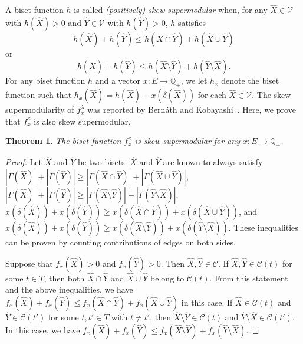 \documentclass{article}
\newtheorem{theorem}{Theorem}
\newcommand{\Cfam}{\mathcal{C}}
\newcommand{\Vfam}{\mathcal{V}}
\newcommand{\Rset}{\mathbb{Q}}
\newcommand{\f}{f^{\kappa}}
\newcommand{\g}{f^{\lambda}}
\begin{document}
A biset function $h$ is called \emph{{\rm (}positively{\rm )} skew supermodular} when, 
for any $\hat{X} \in \Vfam$ with $h(\hat{X})>0$ and $\hat{Y}\in \Vfam$ with $h(\hat{Y})>0$, 
$h$ satisfies 
\begin{equation}\label{eq:supermodular}
h(\hat{X})+h(\hat{Y}) \leq h(\hat{X}\cap \hat{Y}) + h(\hat{X} \cup \hat{Y})
\end{equation}
or
\begin{equation}\label{eq:negamodular}
h(\hat{X})+h(\hat{Y}) \leq h(\hat{X}\setminus \hat{Y}) + h(\hat{Y} \setminus \hat{X}).
\end{equation}
For any biset function $h$ and a vector
$x\colon E \rightarrow \Rset_+$,
we let $h_{x}$ denote the biset function such that
$h_{x}(\hat{X})=h(\hat{X})-x(\delta(\hat{X}))$ for each $\hat{X} \in \Vfam$.
The skew supermodularity of $\g_{x}$ was reported by Bern{\'a}th and
Kobayashi~\cite{Bernath2014}. Here, we prove that $\f_{x}$ is also skew supermodular.

\begin{theorem}\label{thm:skewsupermodular}
The biset function $\f_{x}$ is skew supermodular for any $x\colon E \rightarrow \Rset_+$.
\end{theorem}
\begin{proof}
Let $\hat{X}$ and $\hat{Y}$ be two bisets.
$\hat{X}$ and $\hat{Y}$ are known to always satisfy
$|\Gamma(\hat{X})|+|\Gamma(\hat{Y})| \geq |\Gamma(\hat{X}\cap \hat{Y})|+|\Gamma(\hat{X}\cup \hat{Y})|$,
$|\Gamma(\hat{X})|+|\Gamma(\hat{Y})| \geq |\Gamma(\hat{X}\setminus \hat{Y})|+|\Gamma(\hat{Y}\setminus
\hat{X})|$,
$x(\delta(\hat{X}))+x(\delta(\hat{Y})) \geq x(\delta(\hat{X}\cap \hat{Y}))+x(\delta(\hat{X}\cup
\hat{Y}))$,
and
$x(\delta(\hat{X}))+x(\delta(\hat{Y})) 
\geq x(\delta(\hat{X}\setminus \hat{Y})) + x(\delta(\hat{Y}\setminus \hat{X}))$.
These inequalities can be proven by counting contributions of edges on both sides.

Suppose that $f_{x}(\hat{X}) >0$ and $f_{x}(\hat{Y})>0$.
Then $\hat{X},\hat{Y} \in \Cfam$.
If $\hat{X}, \hat{Y} \in \Cfam(t)$ for some $t \in T$, then both $\hat{X}\cap \hat{Y}$ and 
$\hat{X}\cup \hat{Y}$ belong to $\Cfam(t)$.
From this statement and the above inequalities, we have 
$f_{x}(\hat{X})+f_{x}(\hat{Y})
\leq f_{x}(\hat{X} \cap \hat{Y})+f_{x}(\hat{X}\cup \hat{Y})$ in this case.
If $\hat{X} \in \Cfam(t)$ and $\hat{Y} \in \Cfam(t')$ for some $t,t' \in T$ with $t\neq t'$, 
then $\hat{X}\setminus \hat{Y} \in \Cfam(t)$ and $\hat{Y}\setminus \hat{X} \in \Cfam(t')$.
In this case, we have 
$f_{x}(\hat{X})+f_{x}(\hat{Y})
\leq f_{x}(\hat{X} \setminus \hat{Y})+f_{x}(\hat{Y}\setminus \hat{X})$.
\end{proof}
\end{document}
